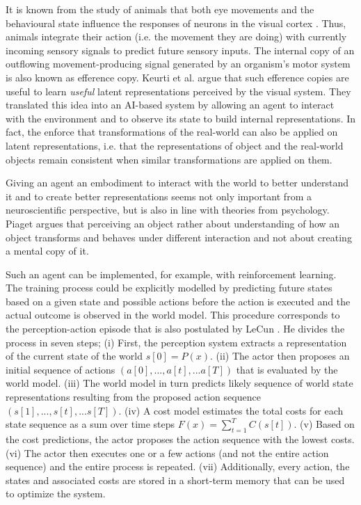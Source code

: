 It is known from the study of animals that both eye movements and the behavioural state influence the responses of neurons in the visual cortex .
Thus, animals integrate their action (i.e. the movement they are doing) with currently incoming sensory signals to predict future sensory inputs.
The internal copy of an outflowing movement-producing signal generated by an organism's motor system is also known as efference copy.
Keurti et al.  argue that such efference copies are useful to learn \emph{useful} latent representations perceived by the visual system.
They translated this idea into an AI-based system by allowing an agent to interact with the environment and to observe its state to build internal representations.
In fact, the enforce that transformations of the real-world can also be applied on latent representations, i.e. that the representations of object and the real-world objects remain consistent when similar transformations are applied on them.

Giving an agent an embodiment to interact with the world to better understand it and to create better representations seems not only important from a neuroscientific perspective, but is also in line with theories from psychology.
Piaget  argues that perceiving an object rather about understanding of how an object transforms and behaves under different interaction and not about creating a mental copy of it.

Such an agent can be implemented, for example, with reinforcement learning.
The training process could be explicitly modelled by predicting future states based on a given state and possible actions before the action is executed and the actual outcome is observed in the world model.
This procedure corresponds to the perception-action episode that is also postulated by LeCun .
He divides the process in seven steps;
(i) First, the perception system extracts a representation of the current state of the world $s[0]=P(x)$. (ii) The actor then proposes an initial sequence of actions $(a[0], ..., a[t], ... a[T])$ that is evaluated by the world model. (iii) The world model in turn predicts likely sequence of world state representations resulting from the proposed action sequence $(s[1], ..., s[t], ... s[T])$. (iv) A cost model estimates the total costs for each state sequence as a sum over time steps $F(x)=\sum_{t=1}^{T}C(s[t])$. (v) Based on the cost predictions, the actor proposes the action sequence with the lowest costs. (vi) The actor then executes one or a few actions (and not the entire action sequence) and the entire process is repeated. (vii) Additionally, every action, the states and associated costs are stored in a short-term memory that can be used to optimize the system.




